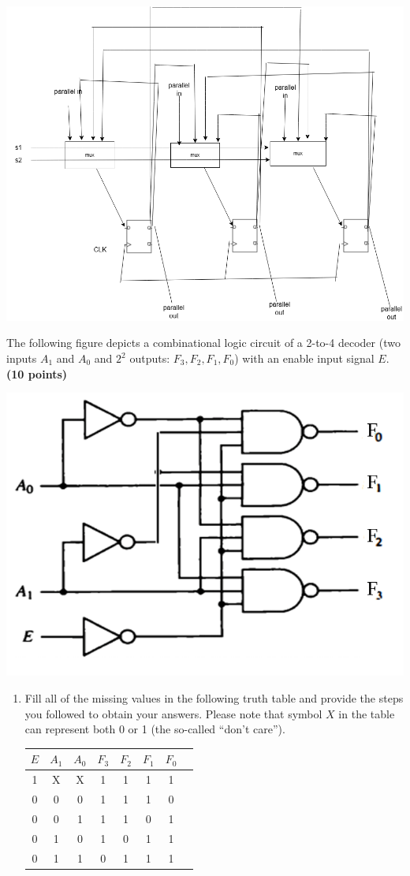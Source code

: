 \documentclass[10pt,answers]{exam}
\newcommand{\qpoints}[1]{\hfill \textbf{(#1 points)}}
\begin{document}
\begin{questions}
\begin{solution}
    \begin{center}
		\includegraphics[width=0.6\linewidth]{ex6.png}
		\end{center}
\end{solution}


\question The following figure depicts a combinational logic circuit of a 2-to-4 decoder (two inputs $A_1$ and $A_0$ and $2^2$ outputs: $F_3, F_2, F_1, F_0$) with an enable input signal $E$. \qpoints{10}

\begin{center}
\includegraphics[width=0.5\linewidth]{images/ex7.png}
\end{center}

\begin{enumerate}[label=\alph*)]
    \item Fill all of the missing values in the following truth table and provide the steps you followed to obtain your answers. Please note that symbol $X$ in the table can represent both 0 or 1 (the so-called “don’t care”).
\begin{solution}
    \begin{center}
        \begin{tabular}{|c|c|c|c|c|c|c|c|}
        \hline
        $E$ & $A_1$ & $A_0$ & $F_3$ & $F_2$ & $F_1$ & $F_0$ \\ \hline
        1   & X     & X     & 1      & 1      & 1       & 1      \\ \hline
        0   & 0     & 0     & 1      & 1      & 1      & 0      \\ \hline
        0   & 0     & 1     & 1      & 1      & 0      & 1      \\ \hline
        0   & 1     & 0     &  1     & 0      & 1      & 1      \\ \hline
        0   & 1     & 1     & 0      & 1      & 1      & 1      \\ \hline


\end{tabular}
\end{center}
\end{solution}
\end{enumerate}
\end{questions}
\end{document}
